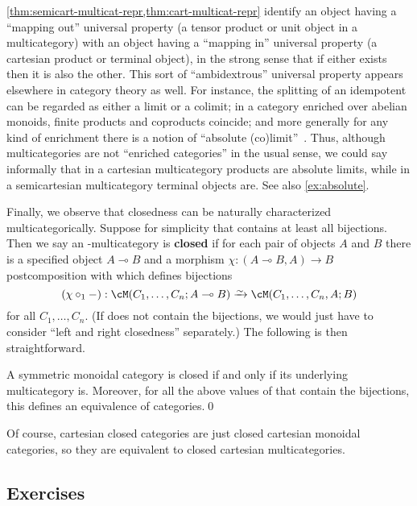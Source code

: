 \documentclass{book}
\let\hom\multimap
\begin{document}
\begin{rmk}\label{rmk:absolute}
  \cref{thm:semicart-multicat-repr,thm:cart-multicat-repr} identify an object having a ``mapping out'' universal property (a tensor product or unit object in a multicategory) with an object having a ``mapping in'' universal property (a cartesian product or terminal object), in the strong sense that if either exists then it is also the other.
  This sort of ``ambidextrous'' universal property appears elsewhere in category theory as well.
  For instance, the splitting of an idempotent can be regarded as either a limit or a colimit; in a category enriched over abelian monoids, finite products and coproducts coincide; and more generally for any kind of enrichment there is a notion of ``absolute (co)limit''~\cite{street:absolute}.
  Thus, although multicategories are not ``enriched categories'' in the usual sense, we could say informally that in a cartesian multicategory products are absolute limits, while in a semicartesian multicategory terminal objects are.
  See also \cref{ex:absolute}.
\end{rmk}

Finally, we observe that closedness can be naturally characterized multicategorically.
Suppose for simplicity that \fS contains at least all bijections.
Then we say an \fS-multicategory is \textbf{closed} if for each pair of objects $A$ and $B$ there is a specified object $A\hom B$ and a morphism $\chi : (A\hom B,A) \to B$ postcomposition with which defines bijections
\[ (\chi\circ_1 -): \cM(C_1,\dots,C_n;A\hom B) \toiso \cM(C_1,\dots,C_n,A;B) \]
for all $C_1,\dots,C_n$.
(If \fS does not contain the bijections, we would just have to consider ``left and right closedness'' separately.)
The following is then straightforward.

\begin{thm}\label{thm:moncat-repr-closed}
  A symmetric monoidal category is closed if and only if its underlying multicategory is.
  Moreover, for all the above values of \fS that contain the bijections, this defines an equivalence of categories.\qed
\end{thm}

Of course, cartesian closed categories are just closed cartesian monoidal categories, so they are equivalent to closed cartesian multicategories.

\subsection*{Exercises}
\end{document}
